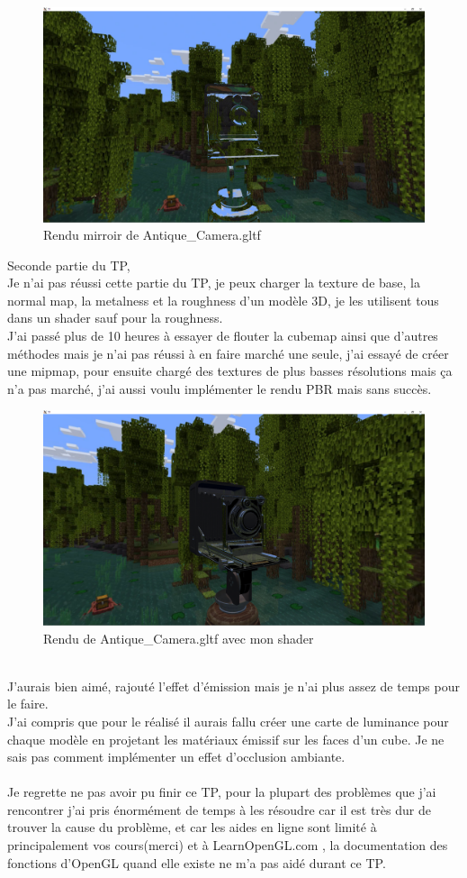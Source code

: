 \documentclass[12pt]{report}
\begin{document}
\begin{figure}[h!]
    \centering
    \includegraphics[width=12.0cm]{minecraft2.png}
    \caption{Rendu mirroir de Antique\_Camera.gltf}
    \label{fig:1}
\end{figure}

\newpage
Seconde partie du TP,
\\
Je n'ai pas réussi cette partie du TP, je peux charger la texture de base, la normal map, la metalness et la roughness d'un modèle 3D, je les utilisent tous dans un shader sauf pour la roughness.\\ J'ai passé plus de 10 heures à essayer de flouter la cubemap ainsi que d'autres méthodes mais je n'ai pas réussi à en faire marché une seule, j'ai essayé de créer une mipmap, pour ensuite chargé des textures de plus basses résolutions mais ça n'a pas marché, j'ai aussi voulu implémenter le rendu PBR mais sans succès.\\
\begin{figure}[h!]
    \centering
    \includegraphics[width=12.0cm]{minecraft.png}
    \caption{Rendu de Antique\_Camera.gltf avec mon shader}
    \label{fig:1}
\end{figure}
\\
J'aurais bien aimé, rajouté l'effet d'émission mais je n'ai plus assez de temps pour le faire.\\
J'ai compris que pour le réalisé il aurais fallu créer une carte de luminance pour chaque modèle en projetant les matériaux émissif sur les faces d'un cube. Je ne sais pas comment implémenter un effet d'occlusion ambiante.\\
\\
Je regrette ne pas avoir pu finir ce TP, pour la plupart des problèmes que j'ai rencontrer j'ai pris énormément de temps à les résoudre car il est très dur de trouver la cause du problème, et car les aides en ligne sont limité à principalement vos cours(merci) et à LearnOpenGL.com , la documentation des fonctions d'OpenGL quand elle existe ne m'a pas aidé durant ce TP. 
\end{document}
